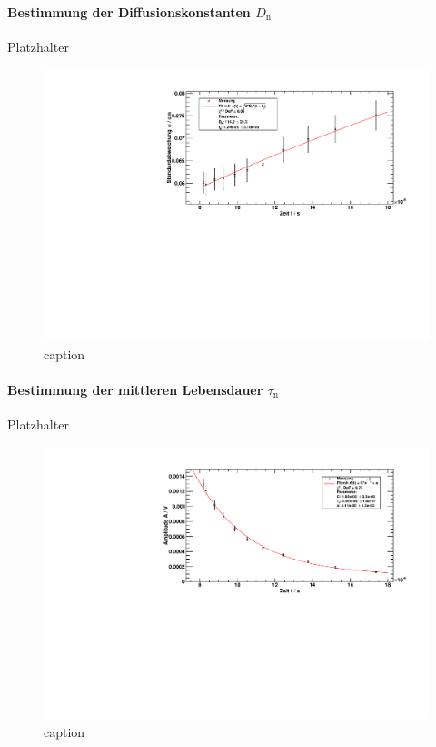 \paragraph{Bestimmung der Diffusionskonstanten $D_\text{n}$}
Platzhalter

\begin{figure}[H]
\begin{center}
  \includegraphics[width=\textwidth]{../img/part2/volt_fitSigma.pdf}
  \caption{caption}
  \label{img:volt:fitsigma}
\end{center}
\end{figure}

\paragraph{Bestimmung der mittleren Lebensdauer $\tau_\text{n}$}
Platzhalter

\begin{figure}[H]
\begin{center}
  \includegraphics[width=\textwidth]{../img/part2/volt_fitA.pdf}
  \caption{caption}
  \label{img:volt:fita}
\end{center}
\end{figure}